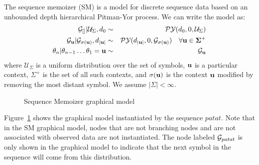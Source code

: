 The sequence memoizer (SM) \cite{Wood2009} is a model for discrete sequence data based on an unbounded depth hierarchical Pitman-Yor process. We can write the model as:
%
\begin{eqnarray*}
	\G_{[]} | \mathcal{U}_{\Sigma}, d_0 &\sim& \PY(d_0, 0, \mathcal{U}_{\Sigma }) \\
	\G_{\bf{u}} | \G_{\sigma(\bf{u})}, d_{|\bf{u}|} &\sim& \PY(d_{|\bf{u}|}, 0, \G_{\sigma(\bf{u})}) \hspace{.35cm} \forall \bf{u} \in \Sigma^+\\
	\theta_n | \theta_{n-1}  \ldots \theta_1 = \bf{u} &\sim& \G_{\bf{u}}
\end{eqnarray*}
%
where $\mathcal{U}_{\Sigma }$ is a uniform distribution over the set of symbols, $\bf{u}$ is a particular context, $\Sigma^+$ is the set of all such contexts, and $\sigma(\bf{u})$ is the context $\bf{u}$ modified by removing the most distant symbol.  We assume $| \Sigma | < \infty$. 
%
\begin{figure}[t] 
	\begin{center}
		\caption{Sequence Memoizer graphical model}
		\label{figprefixtree}
	\end{center} 
\end{figure} 
%
Figure~\ref{figprefixtree} shows the graphical model instantiated by the sequence $patat$.  Note that in the SM graphical model, nodes that are not branching nodes and are not associated with observed data are not instantiated. The node labeled $\G_{patat}$ is only shown in the graphical model to indicate that the next symbol in the sequence will come from this distribution.


